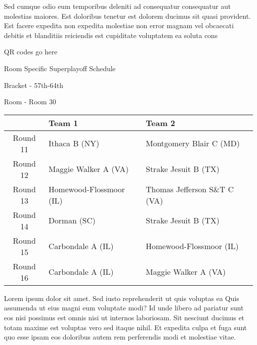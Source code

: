 \documentclass{article}%
\begin{document}
\newline%
    Sed cumque odio eum temporibus deleniti ad consequatur consequatur aut molestias maiores. Est doloribus tenetur est dolorem ducimus sit quasi provident. Est facere expedita non expedita molestiae non error magnam vel obcaecati debitis et blanditiis reiciendis est cupiditate voluptatem ea soluta cons%
\vspace*{140pt}%
\begin{center}%
\begin{Huge}%
QR codes go here%
\end{Huge}%
\end{center}%
\newpage%
\begin{center}%
\begin{Huge}%
Room Specific Superplayoff Schedule%
\end{Huge}%
\vspace*{8pt}%
\linebreak%
\begin{Large}%
Bracket {-} 57th{-}64th%
\end{Large}%
\vspace*{8pt}%
\linebreak%
\vspace*{8pt}%
\begin{Large}%
Room {-} Room 30%
\end{Large}%
\end{center}%
%
\begin{tabularx}{\textwidth}{|c|Y|Y|}%
\hline%
&Team 1&Team 2\\%
\hline%
Round 11&Ithaca B (NY)&Montgomery Blair C (MD)\\%
Round 12&Maggie Walker A (VA)&Strake Jesuit B (TX)\\%
Round 13&Homewood{-}Flossmoor (IL)&Thomas Jefferson S\&T C (VA)\\%
Round 14&Dorman (SC)&Strake Jesuit B (TX)\\%
Round 15&Carbondale A (IL)&Homewood{-}Flossmoor (IL)\\%
Round 16&Carbondale A (IL)&Maggie Walker A (VA)\\%
\hline%
\end{tabularx}%
\vspace*{8pt}%
\newline%
    Lorem ipsum dolor sit amet. Sed iusto reprehenderit ut quis voluptas ea Quis assumenda ut eius magni eum voluptate modi? Id unde libero ad pariatur sunt eos nisi possimus est omnis nisi ut internos laboriosam. Sit nesciunt ducimus et totam maxime est voluptas vero sed itaque nihil. Et expedita culpa et fuga sunt quo esse ipsam eos doloribus autem rem perferendis modi et molestiae vitae.\newline%
\end{document}
